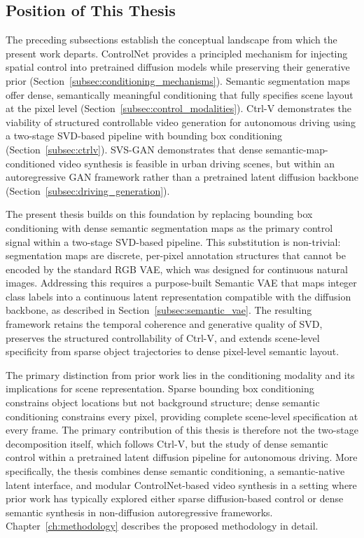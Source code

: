 \FloatBarrier

\subsection{Position of This Thesis}
\label{subsec:thesis_position}

The preceding subsections establish the conceptual landscape from which the present work departs. ControlNet provides a principled mechanism for injecting spatial control into pretrained diffusion models while preserving their generative prior (Section~\ref{subsec:conditioning_mechanisms}). Semantic segmentation maps offer dense, semantically meaningful conditioning that fully specifies scene layout at the pixel level (Section~\ref{subsec:control_modalities}). Ctrl-V demonstrates the viability of structured controllable video generation for autonomous driving using a two-stage SVD-based pipeline with bounding box conditioning (Section~\ref{subsec:ctrlv}). SVS-GAN demonstrates that dense semantic-map-conditioned video synthesis is feasible in urban driving scenes, but within an autoregressive GAN framework rather than a pretrained latent diffusion backbone (Section~\ref{subsec:driving_generation}).

The present thesis builds on this foundation by replacing bounding box conditioning with dense semantic segmentation maps as the primary control signal within a two-stage SVD-based pipeline. This substitution is non-trivial: segmentation maps are discrete, per-pixel annotation structures that cannot be encoded by the standard RGB VAE, which was designed for continuous natural images. Addressing this requires a purpose-built Semantic VAE that maps integer class labels into a continuous latent representation compatible with the diffusion backbone, as described in Section~\ref{subsec:semantic_vae}. The resulting framework retains the temporal coherence and generative quality of SVD, preserves the structured controllability of Ctrl-V, and extends scene-level specificity from sparse object trajectories to dense pixel-level semantic layout.

The primary distinction from prior work lies in the conditioning modality and its implications for scene representation. Sparse bounding box conditioning constrains object locations but not background structure; dense semantic conditioning constrains every pixel, providing complete scene-level specification at every frame. The primary contribution of this thesis is therefore not the two-stage decomposition itself, which follows Ctrl-V, but the study of dense semantic control within a pretrained latent diffusion pipeline for autonomous driving. More specifically, the thesis combines dense semantic conditioning, a semantic-native latent interface, and modular ControlNet-based video synthesis in a setting where prior work has typically explored either sparse diffusion-based control or dense semantic synthesis in non-diffusion autoregressive frameworks. Chapter~\ref{ch:methodology} describes the proposed methodology in detail.
